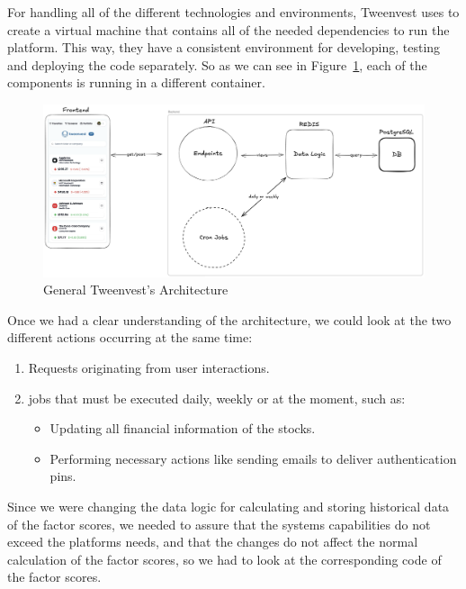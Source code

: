 \documentclass[11pt,english,a4paper,hidelinks]{book}
\begin{document}
\vspace{0.5cm}
\noindent For handling all of the different technologies and environments, Tweenvest uses \textbf{\textcite{dockercompose2024}} to create a virtual machine that contains all of the needed dependencies to run the platform. This way, they have a consistent environment for developing, testing and deploying the code separately. So as we can see in Figure~\ref{fig:general_architecture}, each of the components is running in a different container.

\begin{figure}[H]
    \centering
    \includegraphics[width=1\textwidth]{images/tweenvest/general architecture.png}
    \caption{General Tweenvest's Architecture}
    \label{fig:general_architecture}
\end{figure}

\noindent Once we had a clear understanding of the architecture, we could look at the two different actions occurring at the same time: 
\begin{enumerate}
    \item Requests originating from user interactions.
    \item \acrshort{job}s that must be executed daily, weekly or at the moment, such as:
    \begin{itemize}
        \item Updating all financial information of the stocks.
        \item Performing necessary actions like sending emails to deliver authentication pins.
    \end{itemize}
\end{enumerate}

\noindent Since we were changing the data logic for calculating and storing historical data of the factor scores, we needed to assure that the systems capabilities do not exceed the platforms needs, and that the changes do not affect the normal calculation of the factor scores, so we had to look at the corresponding code of the factor scores.
\end{document}
